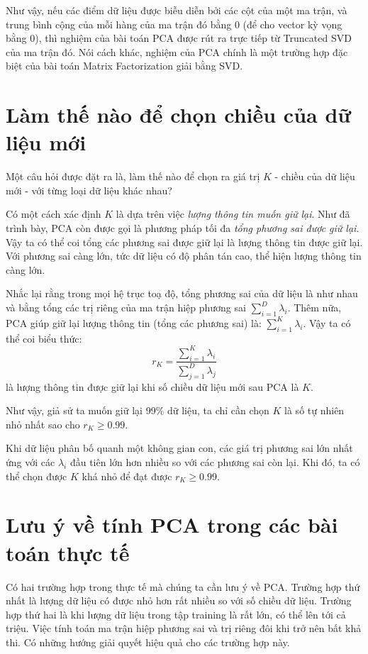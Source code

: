 Như vậy, nếu các điểm dữ liệu được biễu diễn bởi các cột của một ma trận, và trung bình cộng của mỗi hàng của ma trận đó bằng 0 (để cho vector kỳ vọng bằng 0), thì nghiệm của bài toán PCA được rút ra trực tiếp từ Truncated SVD của ma trận đó. Nói cách khác, nghiệm của PCA chính là một trường hợp đặc biệt của bài toán Matrix Factorization giải bằng SVD. 
 
 
\section{Làm thế nào để chọn chiều của dữ liệu mới}
 
Một câu hỏi được đặt ra là, làm thế nào để chọn ra giá trị $K$ - chiều của dữ liệu mới - với từng loại dữ liệu khác nhau? 
 
Có một cách xác định $K$ là dựa trên việc \textit{lượng thông tin muốn giữ lại}. Như đã trình bày, PCA còn được gọi là phương pháp tối đa \textit{tổng phương sai được giữ lại}. Vậy ta có thể coi tổng các phương sai được giữ lại là lượng thông tin được giữ lại. Với phương sai càng lớn, tức dữ liệu có độ phân tán cao, thể hiện lượng thông tin càng lớn. 
 
 Nhắc lại rằng trong mọi hệ trục toạ độ, tổng phương sai của dữ liệu là như nhau và bằng tổng các trị riêng của ma trận hiệp phương sai $\sum_{i=1}^D \lambda_i$. Thêm nữa, PCA giúp giữ lại lượng thông tin (tổng các phương sai) là: $\sum_{i=1}^K \lambda_i$. Vậy ta có thể coi biểu thức: 
\begin{equation} 
 \label{eqn:28_6}
   r_K = \frac{\sum_{i=1}^K \lambda_i}{\sum_{j=1}^D \lambda_j} 
\end{equation} 
là lượng thông tin được giữ lại khi số chiều dữ liệu mới sau PCA là $K$. 
 
Như vậy, giả sử ta muốn giữ lại 99\% dữ liệu, ta chỉ cần chọn $K$ là số tự nhiên nhỏ nhất sao cho $r_K \geq 0.99$. 
 
Khi dữ liệu phân bố quanh một không gian con, các giá trị phương sai lớn nhất ứng với các $\lambda_i$ đầu tiên lớn hơn nhiều so với các phương sai còn lại. Khi đó, ta có thể chọn được $K$ khá nhỏ để đạt được $r_K \geq 0.99$. 
 
 
\section{Lưu ý về tính PCA trong các bài toán thực tế}
Có hai trường hợp trong thực tế mà chúng ta cần lưu ý về PCA. Trường hợp thứ nhất là lượng dữ liệu có được nhỏ hơn rất nhiều so với số chiều dữ liệu. Trường hợp thứ hai là khi lượng dữ liệu trong tập training là rất lớn, có thể lên tới cả triệu. Việc tính toán ma trận hiệp phương sai và trị riêng đôi khi trở nên bất khả thi. Có những hướng giải quyết hiệu quả cho các trường hợp này. 
 
